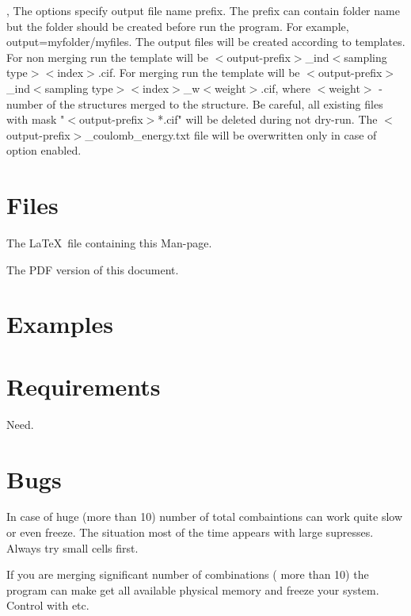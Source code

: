 \documentclass[a4paper,english]{article}
\begin{document}
\begin{Description}
\item[\OptArg{-o }{output-prefix}, \OptArg{\Dd output=}{output-prefix}]
      The options specify output file name prefix. The prefix can contain folder name but the folder should be created before run the program. For example, \Dd output=myfolder/myfiles. The output files will be created according to templates. For non merging run the template will be $<$output-prefix$>$\_ind$<$sampling type$><$index$>$.cif. For merging run the template will be $<$output-prefix$>$\_ind$<$sampling type$><$index$>$\_w$<$weight$>$.cif, where $<$weight$>$ - number of the structures merged to the structure. Be careful, all existing files with mask "$<$output-prefix$>$*.cif" will be deleted during not dry-run. The $<$output-prefix$>$\_coulomb\_energy.txt file will be overwritten only in case of  option enabled.

\end{Description}

\section{Files}

\begin{Description}\setlength{\itemsep}{0cm}
\item[\File{somthing}] The \LaTeX\ file containing this Man-page.
\item[\URL{1.pdf}] The PDF version of this document.
\end{Description}

\section{Examples}


\section{Requirements}

\begin{description}\setlength{\itemsep}{0cm}
\item[openbabel] Need.
\end{description}

\section{Bugs}

\begin{description}\setlength{\itemsep}{0cm}
\item In case of huge (more than 10) number of total combaintions  can work quite slow or even freeze. The situation most of the time appears with large supresses. Always try small cells first.
\item If you are merging significant number of combinations ( more than 10) the program can make get all available physical memory and freeze your system. Control  with  etc.

\end{description}
\end{document}

